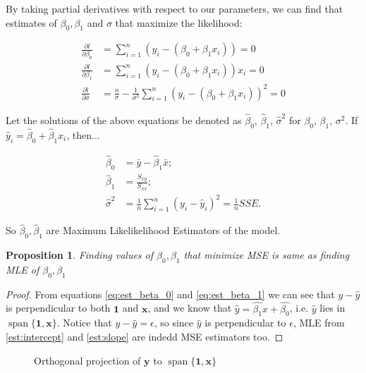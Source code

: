 \documentclass[12pt,a4paper,oneside]{book} %
\DeclareMathOperator{\spn}{span}
\newtheorem{proposition}[theorem]{Proposition}
\begin{document}
By taking partial derivatives with respect to our parameters, we can find that estimates of $\beta_0, \beta_1$ and $\sigma$ that maximize the likelihood:

\begin{align}
	\frac{\partial l}{\partial \beta_0} &= \sum_{i=1}^{n} (y_i - (\beta_0 + \beta_1 x_i)) = 0 \label{eq:est_beta_0} \\
	\frac{\partial l}{\partial \beta_1} &= \sum_{i=1}^{n} (y_i - (\beta_0 + \beta_1 x_i))x_i = 0 \label{eq:est_beta_1} \\
	\frac{\partial l}{\partial \sigma} &= \frac{n}{\sigma} - \frac{1}{\sigma^3} \sum_{i=1}^{n} (y_i - (\beta_0 + \beta_1 x_i))^2 = 0 
\end{align}
	

Let the solutions of the above equations be denoted as $\hat{\beta}_0$, $\hat{\beta}_1$, $\hat{\sigma}^2$ for $\beta_0$, $\beta_1$, $\sigma^2$. If $\hat{y}_i = \hat{\beta}_0 + \hat{\beta}_1 x_i$, then...

\begin{align}
\hat{\beta}_0  &= \bar{y} - \hat{\beta}_1 \bar{x}; \label{est:intercept} \\
\hat{\beta}_1 &= \frac{S_{xy}}{S_{xx}}; \label{est:slope}\\
\hat{\sigma}^2 &= \frac{1}{n} \sum_{i=1}^{n} (y_i - \hat{y}_i)^2 = \frac{1}{n} SSE.
\end{align}

So $\hat{\beta}_0, \hat{\beta}_1$ are Maximum Likelikelihood Estimators of the model.

\begin{proposition}
	Finding values of $\beta_0, \beta_1 $ that minimize MSE is same as finding MLE of $\beta_0 ,\beta_1 $
\end{proposition}


\begin{proof}
	From equations \ref{eq:est_beta_0} and \ref{eq:est_beta_1} we can see that $y-\hat{y}$ is perpendicular to both $\mathbf{1}$ and $\mathbf{x}$, and we know that $\hat{y}=\hat{\beta_1}x+\hat{\beta_0}$, i.e. $\hat{y}$ lies in $\spn \{ \mathbf{1}, \mathbf{x} \}$.
	Notice that $y-\hat{y}=\epsilon$, so since $\hat{y}$ is perpendicular to $\epsilon$, MLE from \ref{est:intercept} and \ref{est:slope} are indedd MSE estimators too.
\end{proof}


\begin{figure}
	\centering
	\caption{Orthogonal projection of $\mathbf{y}$ to $\spn \{ \mathbf{1,x} \}$}
	\label{fig:projection}
\end{figure}%
\end{document}
